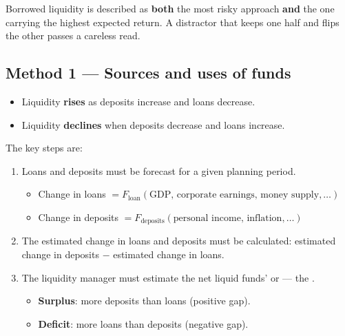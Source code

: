 \begin{lrtrapbox}
Borrowed liquidity is described as \textbf{both} the most risky approach \textbf{and} the one carrying the highest expected return. A distractor that keeps one half and flips the other passes a careless read.
\end{lrtrapbox}


\subsection{Method 1 — Sources and uses of funds}

\begin{lrkeybox}
\begin{itemize}
\item Liquidity \textbf{rises} as deposits increase and loans decrease.
\item Liquidity \textbf{declines} when deposits decrease and loans increase.
\end{itemize}
\end{lrkeybox}

The key steps are:

\begin{enumerate}
\item Loans and deposits must be forecast for a given planning period.
  \begin{itemize}
  \item Change in loans $= F_{\text{loan}}(\text{GDP, corporate earnings, money supply}, \ldots)$
  \item Change in deposits $= F_{\text{deposits}}(\text{personal income, inflation}, \ldots)$
  \end{itemize}
\item The estimated change in loans and deposits must be calculated: estimated change in deposits $-$ estimated change in loans.
\item The liquidity manager must estimate the net liquid funds'  or  — the .
  \begin{itemize}
  \item \textbf{Surplus}: more deposits than loans (positive gap).
  \item \textbf{Deficit}: more loans than deposits (negative gap).
  \end{itemize}
\end{enumerate}

